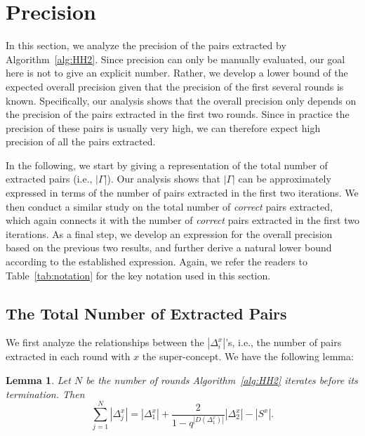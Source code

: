 \documentclass[10pt,journal,cspaper,compsoc]{IEEEtran}
\newtheorem{lemma}{Lemma}
\begin{document}
\section{Precision}\label{sec:analysis:precision}

In this section, we analyze the precision of the pairs extracted by Algorithm~\ref{alg:HH2}. Since precision can only be manually evaluated, our goal here is not to give an explicit number. Rather, we develop a lower bound of the expected overall precision given that the precision of the first several rounds is known. Specifically, our analysis shows that the overall precision only depends on the precision of the pairs extracted in the first two rounds. Since in practice the precision of these pairs is usually very high, we can therefore expect high precision of all the pairs extracted.

In the following, we start by giving a representation of the total number of extracted pairs (i.e., $|\Gamma|$). Our analysis shows that $|\Gamma|$ can be approximately expressed in terms of the number of pairs extracted in the first two iterations. We then conduct a similar study on the total number of \emph{correct} pairs extracted, which again connects it with the number of \emph{correct} pairs extracted in the first two iterations. As a final step, we develop an expression for the overall precision based on the previous two results, and further derive a natural lower bound according to the established expression. Again, we refer the readers to Table~\ref{tab:notation} for the key notation used in this section.

\subsection{The Total Number of Extracted Pairs}

We first analyze the relationships between the $|\Delta_i^x|$'s, i.e., the number of pairs extracted in each round with $x$ the super-concept. We have the following lemma:
\begin{lemma}\label{lemma:Delta}
Let $N$ be the number of rounds Algorithm~\ref{alg:HH2} iterates before its termination. Then
\begin{equation}
\sum_{j=1}^{N}|\Delta_j^x|=|\Delta_1^x| + \frac{2}{1-q^{|D(\Delta_1^x)|}}|\Delta_2^x|-|S^x|.
\end{equation}
\end{lemma}
\end{document}
